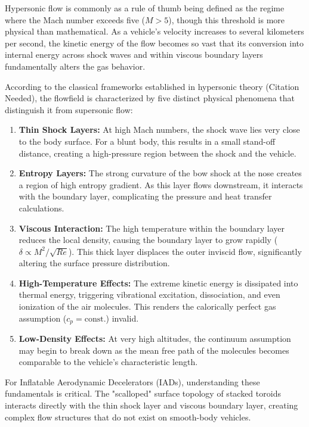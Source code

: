 \par
Hypersonic flow is commonly as a rule of thumb being defined as the regime where the Mach number exceeds five ($M > 5$), though this threshold is more physical than mathematical. As a vehicle's velocity increases to several kilometers per second, the kinetic energy of the flow becomes so vast that its conversion into internal energy across shock waves and within viscous boundary layers fundamentally alters the gas behavior. 
\par
According to the classical frameworks established in hypersonic theory (Citation Needed), the flowfield is characterized by five distinct physical phenomena that distinguish it from supersonic flow:
\par
\begin{enumerate}
    \item \textbf{Thin Shock Layers:} At high Mach numbers, the shock wave lies very close to the body surface. For a blunt body, this results in a small stand-off distance, creating a high-pressure region between the shock and the vehicle.
    \item \textbf{Entropy Layers:} The strong curvature of the bow shock at the nose creates a region of high entropy gradient. As this layer flows downstream, it interacts with the boundary layer, complicating the pressure and heat transfer calculations.
    \item \textbf{Viscous Interaction:} The high temperature within the boundary layer reduces the local density, causing the boundary layer to grow rapidly ($\delta \propto M^2/\sqrt{Re}$). This thick layer displaces the outer inviscid flow, significantly altering the surface pressure distribution.
    \item \textbf{High-Temperature Effects:} The extreme kinetic energy is dissipated into thermal energy, triggering vibrational excitation, dissociation, and even ionization of the air molecules. This renders the calorically perfect gas assumption ($c_p = \text{const.}$) invalid.
    \item \textbf{Low-Density Effects:} At very high altitudes, the continuum assumption may begin to break down as the mean free path of the molecules becomes comparable to the vehicle's characteristic length.
\end{enumerate}
\par
For Inflatable Aerodynamic Decelerators (IADs), understanding these fundamentals is critical. The "scalloped" surface topology of stacked toroids interacts directly with the thin shock layer and viscous boundary layer, creating complex flow structures that do not exist on smooth-body vehicles.
\par


